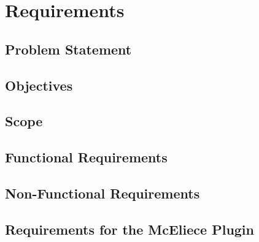 \section{Requirements}
\label{chap:requirements}

\subsection{Problem Statement}
\label{sec:problemStatement}

\subsection{Objectives}
\label{sec:objectives}

\subsection{Scope}
\label{sec:scope}

\subsection{Functional Requirements}
\label{sec:functionalRequirements}

\subsection{Non-Functional Requirements}
\label{sec:nonFunctionalRequirements}

\subsection{Requirements for the McEliece Plugin}
\label{sec:pluginRequirements}
